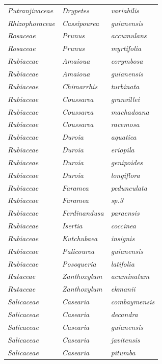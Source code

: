 \documentclass[fleqn,10pt]{ArtEcoFoG} %
\begin{document}
\begin{table}[t]
\begin{tabular}{lll}
\addlinespace
\em{Putranjivaceae} & \em{Drypetes} & \em{variabilis}\\
\em{Rhizophoraceae} & \em{Cassipourea} & \em{guianensis}\\
\em{Rosaceae} & \em{Prunus} & \em{accumulans}\\
\em{Rosaceae} & \em{Prunus} & \em{myrtifolia}\\
\em{Rubiaceae} & \em{Amaioua} & \em{corymbosa}\\
\addlinespace
\em{Rubiaceae} & \em{Amaioua} & \em{guianensis}\\
\em{Rubiaceae} & \em{Chimarrhis} & \em{turbinata}\\
\em{Rubiaceae} & \em{Coussarea} & \em{granvillei}\\
\em{Rubiaceae} & \em{Coussarea} & \em{machadoana}\\
\em{Rubiaceae} & \em{Coussarea} & \em{racemosa}\\
\addlinespace
\em{Rubiaceae} & \em{Duroia} & \em{aquatica}\\
\em{Rubiaceae} & \em{Duroia} & \em{eriopila}\\
\em{Rubiaceae} & \em{Duroia} & \em{genipoides}\\
\em{Rubiaceae} & \em{Duroia} & \em{longiflora}\\
\em{Rubiaceae} & \em{Faramea} & \em{pedunculata}\\
\addlinespace
\em{Rubiaceae} & \em{Faramea} & \em{sp.3}\\
\em{Rubiaceae} & \em{Ferdinandusa} & \em{paraensis}\\
\em{Rubiaceae} & \em{Isertia} & \em{coccinea}\\
\em{Rubiaceae} & \em{Kutchubaea} & \em{insignis}\\
\em{Rubiaceae} & \em{Palicourea} & \em{guianensis}\\
\addlinespace
\em{Rubiaceae} & \em{Posoqueria} & \em{latifolia}\\
\em{Rutaceae} & \em{Zanthoxylum} & \em{acuminatum}\\
\em{Rutaceae} & \em{Zanthoxylum} & \em{ekmanii}\\
\em{Salicaceae} & \em{Casearia} & \em{combaymensis}\\
\em{Salicaceae} & \em{Casearia} & \em{decandra}\\
\addlinespace
\em{Salicaceae} & \em{Casearia} & \em{guianensis}\\
\em{Salicaceae} & \em{Casearia} & \em{javitensis}\\
\em{Salicaceae} & \em{Casearia} & \em{pitumba}\\

\end{tabular}
\end{table}
\end{document}
